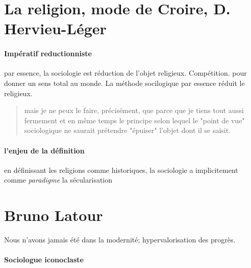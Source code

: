 \section{La religion, mode de Croire, D. Hervieu-Léger}


\paragraph{Impératif reductionniste} par essence, la sociologie est réduction de l'objet religieux.  Compétition. pour donner un sens total au monde.
La méthode socilogique par essence réduit le religieux. 
\begin{quote}
    mais je ne peux le faire, précisément, que parce que je tiens tout aussi fermement et en même temps le principe selon lequel le "point de vue" sociologique ne saurait prétendre "épuiser" l'objet dont il se saisit.
\end{quote}

\paragraph{l'enjeu de la définition} en définissant les religions comme historiques, la sociologie a implicitement comme \textit{paradigme } la sécularisation



\section{Bruno Latour}

Nous n'avons jamais été dans la modernité; hypervalorisation des progrès. 


\paragraph{Sociologue iconoclaste}

